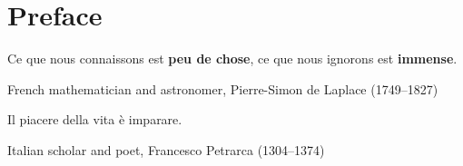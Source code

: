 \chapter*{Preface}


\epigraph{Ce que nous connaissons est \textbf{peu de chose}, ce que nous ignorons est\textbf{ immense}.}{French mathematician and astronomer, Pierre-Simon de Laplace (1749--1827)}



\epigraph{Il piacere della vita è imparare.}{ Italian scholar and poet, Francesco Petrarca (1304--1374) }


\vspace{10mm}
\lipsum[1-5]
\newpage